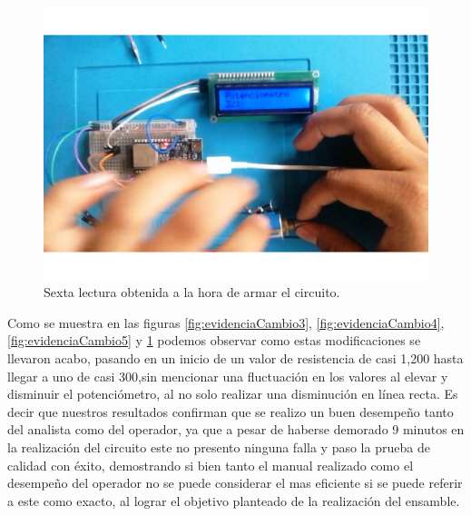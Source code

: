 \begin{figure}[H]
        \centering
        \includegraphics[trim = {45mm 15mm 80mm 20mm},clip,scale=0.5]{19/Img/evidenciaCambio6.pdf}
        \caption{Sexta lectura obtenida a la hora de armar el circuito.}
        \label{fig:evidenciaCambio6}
    \end{figure}
    Como se muestra en las figuras \ref{fig:evidenciaCambio3}, \ref{fig:evidenciaCambio4}, \ref{fig:evidenciaCambio5} y \ref{fig:evidenciaCambio6} podemos observar como estas modificaciones se llevaron acabo, pasando en un inicio de un valor de resistencia de casi 1,200 hasta llegar a uno de casi 300,sin mencionar una fluctuación en los valores al elevar y disminuir el potenciómetro, al no solo realizar una disminución en línea recta. Es decir que nuestros resultados confirman que se realizo un buen desempeño tanto del analista como del operador, ya que a pesar de haberse demorado 9 minutos en la realización del circuito este no presento ninguna falla y paso la prueba de calidad con éxito, demostrando  si bien  tanto el manual realizado como el desempeño del operador no se puede considerar el mas eficiente si se puede referir a este como exacto, al lograr el objetivo planteado de la realización del ensamble.
    
    
